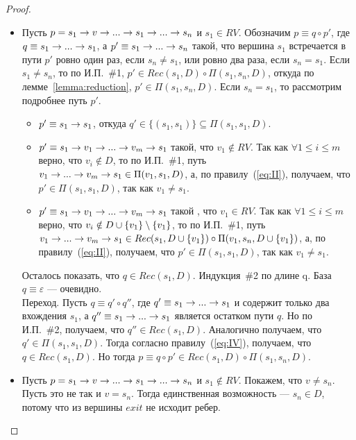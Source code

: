 \begin{proof}
\begin{itemize}
    \item Пусть $p = s_1 \rightarrow v \rightarrow ... \rightarrow s_1 \rightarrow ... \rightarrow s_n$ и $s_1 \in RV$.
          Обозначим $p \equiv q \circ p'$, где $q \equiv s_1 \rightarrow ... \rightarrow s_1$, а
          $p' \equiv s_1 \rightarrow ... \rightarrow s_n$ такой, что вершина $s_1$ встречается в пути $p'$ ровно один раз, если $s_n \neq s_1$, или ровно два раза, если $s_n = s_1$. Если $s_1 \neq s_n$, то по И.П.~\#1, $p' \in Rec(s_1,D) \circ \Pi(s_1,s_n,D)$, откуда по лемме~\ref{lemma:reduction},
          $p' \in \Pi(s_1,s_n,D)$. Если $s_n = s_1$, то рассмотрим подробнее путь $p'$.
          \begin{itemize}
            \item $p' \equiv s_1 \rightarrow s_1$, откуда $q' \in \{(s_1,s_1)\} \subseteq \Pi(s_1,s_1,D)$.
            \item $p' \equiv s_1 \rightarrow v_1 \rightarrow ... \rightarrow v_m \rightarrow s_1$ такой, что $v_1 \notin RV$.
                  Так как $\forall 1 \leq i \leq m$ верно, что $v_i \notin D$, то 
                  по И.П.~\#1, путь $v_1 \rightarrow ... \rightarrow v_m \rightarrow s_1 \in \Pi(v_1, s_1, D)$, а, по правилу~(\ref{eq:II}), получаем, что
                  $p' \in \Pi(s_1,s_1,D)$, так как $v_1 \neq s_1$.
            \item $p' \equiv s_1 \rightarrow v_1 \rightarrow ... \rightarrow v_m \rightarrow s_1$ такой , что $v_1 \in RV$.
                Так как $\forall 1 \leq i \leq m$ верно, что $v_i \notin D \cup \{v_1\} \setminus \{v_1\}$, то 
                по И.П.~\#1, путь $v_1 \rightarrow ... \rightarrow v_m \rightarrow s_1 \in Rec(s_1,D \cup \{v_1\}) \circ \Pi(v_1,s_n,D \cup \{v_1\})$,
                а, по правилу~(\ref{eq:II}), получаем, что $p' \in \Pi(s_1,s_1,D)$, так как $v_1 \neq s_1$.
        \end{itemize}
        Осталось показать, что $q \in Rec(s_1,D)$.
        Индукция~\#2 по длине q. База $q \equiv \varepsilon$ --- очевидно. \\
        Переход. Пусть $q \equiv q' \circ q''$, где $q' \equiv s_1 \rightarrow ... \rightarrow s_1$ и содержит только два вхождения $s_1$, 
        а $q'' \equiv s_1 \rightarrow ... \rightarrow s_1$ является остатком пути $q$.
        Но по И.П.~\#2, получаем, что $q'' \in Rec(s_1, D)$. 
        Аналогично получаем, что $q' \in \Pi(s_1,s_1,D)$. Тогда согласно правилу~(\ref{eq:IV}), получаем, что $q \in Rec(s_1,D)$.
        Но тогда $p \equiv q \circ p' \in Rec(s_1,D) \circ \Pi(s_1,s_n,D)$.
    \item Пусть $p = s_1 \rightarrow v \rightarrow ... \rightarrow s_1 \rightarrow ... \rightarrow s_n$ и $s_1 \notin RV$. Покажем, что $v \neq s_n$.
    Пусть это не так и $v = s_n$. Тогда единственная возможность --- $s_n \in D$, потому что из вершины $exit$ не исходит ребер.

\end{itemize}
\end{proof}

